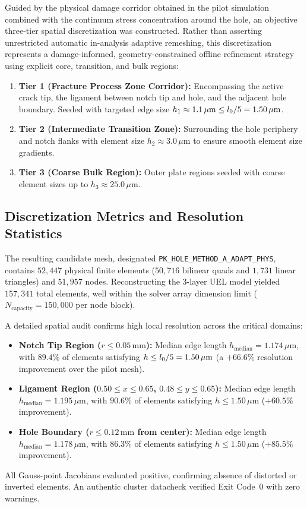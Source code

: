 Guided by the physical damage corridor obtained in the pilot simulation combined with the continuum stress concentration around the hole, an objective three-tier spatial discretization was constructed. Rather than asserting unrestricted automatic in-analysis adaptive remeshing, this discretization represents a damage-informed, geometry-constrained offline refinement strategy using explicit core, transition, and bulk regions:
\begin{enumerate}
  \item \textbf{Tier 1 (Fracture Process Zone Corridor):} Encompassing the active crack tip, the ligament between notch tip and hole, and the adjacent hole boundary. Seeded with targeted edge size $h_1 \approx 1.1\,\mu\mathrm{m} \le l_0 / 5 = 1.50\,\mu\mathrm{m}$.
  \item \textbf{Tier 2 (Intermediate Transition Zone):} Surrounding the hole periphery and notch flanks with element size $h_2 \approx 3.0\,\mu\mathrm{m}$ to ensure smooth element size gradients.
  \item \textbf{Tier 3 (Coarse Bulk Region):} Outer plate regions seeded with coarse element sizes up to $h_3 \approx 25.0\,\mu\mathrm{m}$.
\end{enumerate}

\subsection{Discretization Metrics and Resolution Statistics}
\label{subsec:mesh_metrics}

The resulting candidate mesh, designated \texttt{PK\_HOLE\_METHOD\_A\_ADAPT\_PHYS}, contains $52{,}447$ physical finite elements ($50{,}716$ bilinear quads and $1{,}731$ linear triangles) and $51{,}957$ nodes. Reconstructing the 3-layer UEL model yielded $157{,}341$ total elements, well within the solver array dimension limit ($N_{\mathrm{capacity}} = 150{,}000$ per node block).

A detailed spatial audit confirms high local resolution across the critical domains:
\begin{itemize}
  \item \textbf{Notch Tip Region ($r \le 0.05\,\mathrm{mm}$):} Median edge length $h_{\mathrm{median}} = 1.174\,\mu\mathrm{m}$, with $89.4\%$ of elements satisfying $h \le l_0 / 5 = 1.50\,\mu\mathrm{m}$ (a $+66.6\%$ resolution improvement over the pilot mesh).
  \item \textbf{Ligament Region ($0.50 \le x \le 0.65$, $0.48 \le y \le 0.65$):} Median edge length $h_{\mathrm{median}} = 1.195\,\mu\mathrm{m}$, with $90.6\%$ of elements satisfying $h \le 1.50\,\mu\mathrm{m}$ ($+60.5\%$ improvement).
  \item \textbf{Hole Boundary ($r \le 0.12\,\mathrm{mm}$ from center):} Median edge length $h_{\mathrm{median}} = 1.178\,\mu\mathrm{m}$, with $86.3\%$ of elements satisfying $h \le 1.50\,\mu\mathrm{m}$ ($+85.5\%$ improvement).
\end{itemize}
All Gauss-point Jacobians evaluated positive, confirming absence of distorted or inverted elements. An authentic cluster datacheck verified Exit Code~0 with zero warnings.

